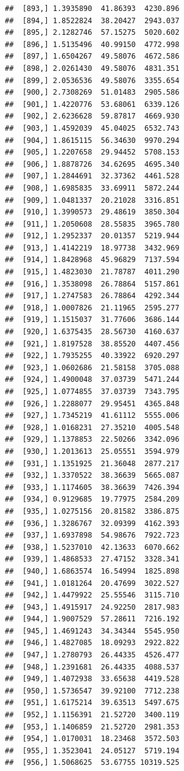 \documentclass[article]{jss}\usepackage[]{graphicx}\usepackage[]{xcolor}
\makeatletter
\newenvironment{kframe}{%
 \def\at@end@of@kframe{}%
 \ifinner\ifhmode%
  \def\at@end@of@kframe{\end{minipage}}%
  \begin{minipage}{\columnwidth}%
 \fi\fi%
 \def\FrameCommand##1{\hskip\@totalleftmargin \hskip-\fboxsep
 \colorbox{shadecolor}{##1}\hskip-\fboxsep
     \hskip-\linewidth \hskip-\@totalleftmargin \hskip\columnwidth}%
 \MakeFramed {\advance\hsize-\width
   \@totalleftmargin\z@ \linewidth\hsize
   \@setminipage}}%
 {\par\unskip\endMakeFramed%
 \at@end@of@kframe}
\newenvironment{knitrout}{}{} %
\makeatother
\begin{document}
\begin{knitrout}
\begin{kframe}
\begin{verbatim}
##  [893,] 1.3935890  41.86393  4230.896
##  [894,] 1.8522824  38.20427  2943.037
##  [895,] 2.1282746  57.15275  5020.602
##  [896,] 1.5135496  40.99150  4772.998
##  [897,] 1.6504267  49.58076  4672.586
##  [898,] 2.0261430  49.58076  4831.351
##  [899,] 2.0536536  49.58076  3355.654
##  [900,] 2.7308269  51.01483  2905.586
##  [901,] 1.4220776  53.68061  6339.126
##  [902,] 2.6236628  59.87817  4669.930
##  [903,] 1.4592039  45.04025  6532.743
##  [904,] 1.8615115  56.34630  9970.294
##  [905,] 1.2207658  29.94452  5708.153
##  [906,] 1.8878726  34.62695  4695.340
##  [907,] 1.2844691  32.37362  4461.528
##  [908,] 1.6985835  33.69911  5872.244
##  [909,] 1.0481337  20.21028  3316.851
##  [910,] 1.3990573  29.48619  3850.304
##  [911,] 1.2050608  28.55835  3965.780
##  [912,] 1.2952337  20.01357  5219.944
##  [913,] 1.4142219  18.97738  3432.969
##  [914,] 1.8428968  45.96829  7137.594
##  [915,] 1.4823030  21.78787  4011.290
##  [916,] 1.3538098  26.78864  5157.861
##  [917,] 1.2747583  26.78864  4292.344
##  [918,] 1.0007826  21.11965  2595.277
##  [919,] 1.1515037  31.77606  3686.144
##  [920,] 1.6375435  28.56730  4160.637
##  [921,] 1.8197528  38.85520  4407.456
##  [922,] 1.7935255  40.33922  6920.297
##  [923,] 1.0602686  21.58158  3705.088
##  [924,] 1.4900048  37.03739  5471.244
##  [925,] 1.0774855  37.03739  7343.795
##  [926,] 1.2288077  29.95451  4365.848
##  [927,] 1.7345219  41.61112  5555.006
##  [928,] 1.0168231  27.35210  4005.548
##  [929,] 1.1378853  22.50266  3342.096
##  [930,] 1.2013613  25.05551  3594.979
##  [931,] 1.1351925  21.36048  2877.217
##  [932,] 1.3370522  38.36639  5665.087
##  [933,] 1.1174605  38.36639  7426.394
##  [934,] 0.9129685  19.77975  2584.209
##  [935,] 1.0275156  20.81582  3386.875
##  [936,] 1.3286767  32.09399  4162.393
##  [937,] 1.6937898  54.98676  7922.723
##  [938,] 1.5237010  42.13633  6070.662
##  [939,] 1.4868533  27.47152  3328.341
##  [940,] 1.6863574  16.54994  1825.898
##  [941,] 1.0181264  20.47699  3022.527
##  [942,] 1.4479922  25.55546  3115.710
##  [943,] 1.4915917  24.92250  2817.983
##  [944,] 1.9007529  57.28611  7216.192
##  [945,] 1.4691243  34.34344  5545.950
##  [946,] 1.4827085  18.09293  2922.822
##  [947,] 1.2780793  26.44335  4526.477
##  [948,] 1.2391681  26.44335  4088.537
##  [949,] 1.4072938  33.65638  4419.528
##  [950,] 1.5736547  39.92100  7712.238
##  [951,] 1.6175214  39.63513  5497.675
##  [952,] 1.1156391  21.52720  3400.119
##  [953,] 1.1406859  21.52720  2981.353
##  [954,] 1.0170031  18.23468  3572.503
##  [955,] 1.3523041  24.05127  5719.194
##  [956,] 1.5068625  53.67755 10319.525

\end{verbatim}
\end{kframe}
\end{knitrout}
\end{document}
